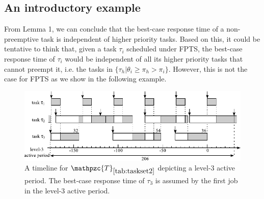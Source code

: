 \documentclass[conference,compsoc]{IEEEtran}
\begin{document}
\subsection{An introductory example}
From Lemma 1, we can conclude that the best-case response time of a non-preemptive task  is independent of higher priority tasks. Based on this, it could be tentative to think that, given a task $\tau_i$ scheduled under FPTS, the best-case response time of $\tau_i$ would be independent of all its higher priority tasks that cannot preempt it, i.e. the tasks in $\{\tau_h | \theta_i \geq \pi_h > \pi_i\}$. However, this is not the case for FPTS as we show in the following example.

\begin{figure}
	\centering
	\includegraphics[width=0.66\linewidth]{fig/fpps_fact1_3}
	\caption{A timeline for $\mathpzc{T}_{\ref{tab:taskset2}}$ depicting a level-3 active period. The best-case response time of $\tau_3$ is assumed by the first job in the level-3 active period.}
	\label{fig:fpps_fact1}
\end{figure}



\end{document}
